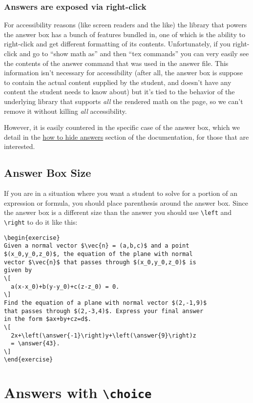 \documentclass{ximera}
\begin{document}
\subsubsection{Answers are exposed via right-click}

For accessibility reasons (like screen readers and the like) the library
that powers the answer box has a bunch of features bundled in, one of which is
the ability to right-click and get different formatting of its contents.
Unfortunately, if you right-click and go to ``show math as'' and then ``tex
commands'' you can very easily see the contents of the answer command that was
used in the answer file. This information isn't necessary for accessibility
(after all, the answer box is suppose to contain the actual content supplied by
the student, and doesn't have any content the student needs to know about) but
it's tied to the behavior of the underlying library that supports \textit{all}
the rendered math on the page, so we can't remove it without killing
\textit{all} accessibility.

However, it is easily countered in the specific case of the answer box,
which we detail in the
\href{https://xronos.clas.ufl.edu/examples/exampleCore/supplemental/hiddenAnswers}{how
  to hide answers} section of the documentation, for those that are interested.

\subsection{Answer Box Size}
If you are in a situation where you want a student to solve for a portion
of an expression or formula, you should place parenthesis around the answer
box. Since the answer box is a different size than the answer you should use
\verb!\left! and \verb!\right! to do it like
this:
\begin{verbatim}
\begin{exercise}
Given a normal vector $\vec{n} = (a,b,c)$ and a point
$(x_0,y_0,z_0)$, the equation of the plane with normal
vector $\vec{n}$ that passes through $(x_0,y_0,z_0)$ is
given by
\[
  a(x-x_0)+b(y-y_0)+c(z-z_0) = 0.
\]
Find the equation of a plane with normal vector $(2,-1,9)$
that passes through $(2,-3,4)$. Express your final answer
in the form $ax+by+cz=d$.
\[
  2x+\left(\answer{-1}\right)y+\left(\answer{9}\right)z
  = \answer{43}.
\]
\end{exercise}
\end{verbatim}

\section{Answers with \texttt{\textbackslash choice}}
\end{document}

